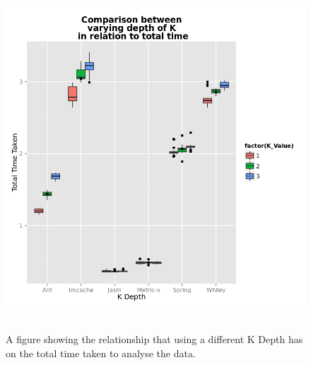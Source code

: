 \documentclass[11pt
              , a4paper
              , twoside
              , openright
              ]{report}
\begin{document}
\begin{figure}[h]
\centering
\includegraphics[width=\textwidth,height=13cm]{KDepthTime.png}
\caption{A figure showing the relationship that using a different K Depth has on the total time taken to analyse the data.}
\label{fig:kdepthtime}
\end{figure}
\end{document}
